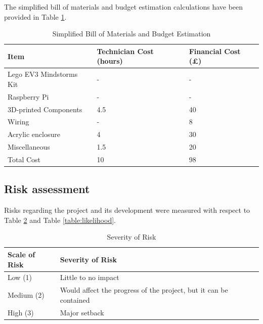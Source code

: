 \documentclass{article}
\begin{document}
The simplified bill of materials and budget estimation calculations have been provided in Table \ref{table:budget}.

\begin{table}[]
\begin{center}
\begin{small}
\begin{tabular}{|p{3cm}|p{1.5cm}|p{1.5cm}|}
\hline
\rowcolor[HTML]{C0C0C0} 
Item                    & Technician Cost (hours) & Financial Cost (\pounds) \\ \hline
Lego EV3 Mindstorms Kit & -                       & -                  \\ \hline
Raspberry Pi            & -                       & -                  \\ \hline
3D-printed Components   & 4.5                     & 40                 \\ \hline
Wiring                  & -                       & 8                  \\ \hline
Acrylic enclosure       & 4                       & 30                 \\ \hline
Miscellaneous           & 1.5                     & 20                 \\ \hline
Total Cost              & 10                      & 98                 \\ \hline
\end{tabular}
\end{small}
\end{center}
\caption{Simplified Bill of Materials and Budget Estimation}
\label{table:budget}
\end{table}

\subsection{Risk assessment}

Risks regarding the project and its development were measured with respect to Table \ref{table:severity} and Table \ref{table:likelihood}.

\begin{table}[h]
\begin{center}
\begin{small}
\begin{tabular}{|l|p{3cm}|}
\hline
\rowcolor[HTML]{C0C0C0}Scale of Risk & Severity of Risk                        \\ \hline
Low (1)    & Little to no impact                                               \\ \hline
Medium (2) & Would affect the progress of the project, but it can be contained \\ \hline
High (3)   & Major setback                                                     \\ \hline
\end{tabular}
\end{small}
\end{center}
\caption{Severity of Risk}
\label{table:severity}
\end{table}
\end{document}
